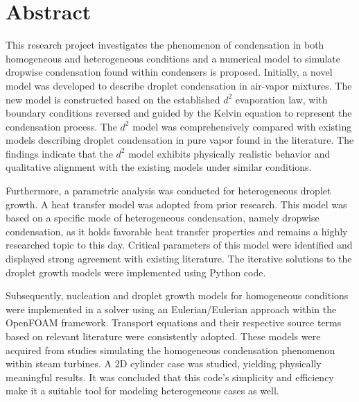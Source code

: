 \documentclass[12pt]{article}
\numberwithin{equation}{section}
\begin{document}
 
\newpage


\setcounter{page}{2}

\section*{Abstract}

This research project investigates the phenomenon of condensation in both homogeneous and heterogeneous conditions and a numerical model to simulate dropwise condensation found within condensers is proposed. Initially, a novel model was developed to describe droplet condensation in air-vapor mixtures. The new model is constructed based on the established $d^{2}$ evaporation law, with boundary conditions reversed and guided by the Kelvin equation to represent the condensation process. The $d^{2}$ model was comprehensively compared with existing models describing droplet condensation in pure vapor found in the literature. The findings indicate that the $d^{2}$ model exhibits physically realistic behavior and qualitative alignment with the existing models under similar conditions.

Furthermore, a parametric analysis was conducted for heterogeneous droplet growth. A heat transfer model was adopted from prior research. This model was based on a specific mode of heterogeneous condensation, namely dropwise condensation, as it holds favorable heat transfer properties and remains a highly researched topic to this day. Critical parameters of this model were identified and displayed strong agreement with existing literature. The iterative solutions to the droplet growth models were implemented using Python code.

Subsequently, nucleation and droplet growth models for homogeneous conditions were implemented in a solver using an Eulerian/Eulerian approach within the OpenFOAM framework. Transport equations and their respective source terms based on relevant literature were consistently adopted. These models were acquired from studies simulating the homogeneous condensation phenomenon within steam turbines. A 2D cylinder case was studied, yielding physically meaningful results. It was concluded that this code's simplicity and efficiency make it a suitable tool for modeling heterogeneous cases as well.
\end{document}
